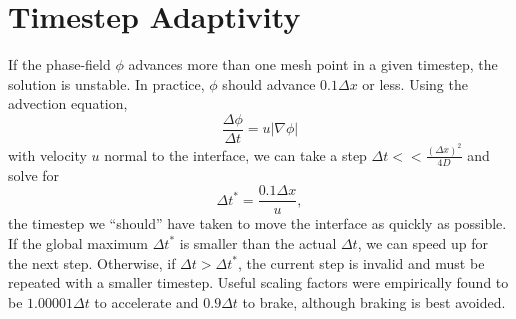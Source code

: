 \documentclass[10pt]{article}
\begin{document}
	\section{Timestep Adaptivity}
		If the phase-field $\phi$ advances more than one mesh point in a given timestep, the solution is unstable.
		In practice, $\phi$ should advance $0.1\Delta x$ or less.
		Using the advection equation,
		\begin{equation}
			\frac{\Delta \phi}{\Delta t} = u|\nabla\phi|
		\end{equation}
		with velocity $u$ normal to the interface,
		we can take a step $\Delta t << \frac{(\Delta x)^2}{4D}$
		and solve for
		\begin{equation}
			\Delta t^* = \frac{0.1\Delta x}{u},
		\end{equation}
		the timestep we ``should'' have taken to move the interface as quickly as possible.
		If the global maximum $\Delta t^*$ is smaller than the actual $\Delta t$, we can speed up for the next step.
		Otherwise, if $\Delta t > \Delta t^*$, the current step is invalid and must be repeated with a smaller timestep.
		Useful scaling factors were empirically found to be $1.00001 \Delta t$ to accelerate and $0.9 \Delta t$ to brake,
		although braking is best avoided.
		


	\appendix
	\newpage
\end{document}
